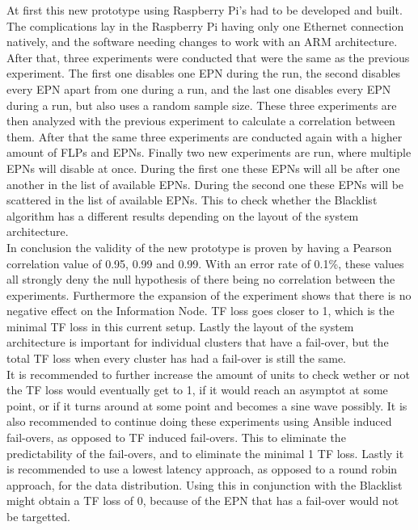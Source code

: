 At first this new prototype using Raspberry Pi's had to be developed and built. The complications lay in the Raspberry Pi having only one Ethernet connection natively, and the software needing changes to work with an ARM architecture. After that, three experiments were conducted that were the same as the previous experiment. The first one disables one EPN during the run, the second disables every EPN apart from one during a run, and the last one disables every EPN during a run, but also uses a random sample size. These three experiments are then analyzed with the previous experiment to calculate a correlation between them. After that the same three experiments are conducted again with a higher amount of FLPs and EPNs. Finally two new experiments are run, where multiple EPNs will disable at once. During the first one these EPNs will all be after one another in the list of available EPNs. During the second one these EPNs will be scattered in the list of available EPNs. This to check whether the Blacklist algorithm has a different results depending on the layout of the system architecture. \\
In conclusion the validity of the new prototype is proven by having a Pearson correlation value of 0.95, 0.99 and 0.99. With an error rate of 0.1\%, these values all strongly deny the null hypothesis of there being no correlation between the experiments. Furthermore the expansion of the experiment shows that there is no negative effect on the Information Node. TF loss goes closer to 1, which is the minimal TF loss in this current setup. Lastly the layout of the system architecture is important for individual clusters that have a fail-over, but the total TF loss when every cluster has had a fail-over is still the same. \\
It is recommended to further increase the amount of units to check wether or not the TF loss would eventually get to 1, if it would reach an asymptot at some point, or if it turns around at some point and becomes a sine wave possibly. It is also recommended to continue doing these experiments using Ansible induced fail-overs, as opposed to TF induced fail-overs. This to eliminate the predictability of the fail-overs, and to eliminate the minimal 1 TF loss. Lastly it is recommended to use a lowest latency approach, as opposed to a round robin approach, for the data distribution. Using this in conjunction with the Blacklist might obtain a TF loss of 0, because of the EPN that has a fail-over would not be targetted.